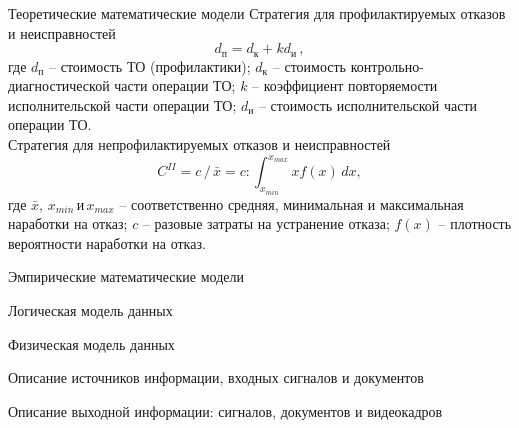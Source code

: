 \documentclass{beamer}
\begin{document}
\begin{frame}
	{Теоретические математические модели}
    Стратегия для профилактируемых отказов и неисправностей
    \begin{equation*}
        d_{\text{п}} = d_{\text{к}} + k d_{\text{и}}\,,
    \end{equation*}
    {\footnotesize
        где $d_{\text{п}}$ -- стоимость ТО (профилактики); $d_{\text{к}}$ --
        стоимость контрольно-диагностической части операции ТО; $k$ --
        коэффициент повторяемости исполнительской части операции ТО;
        $d_{\text{и}}$ -- стоимость исполнительской части операции ТО.
    }
    \\[\baselineskip]
    Стратегия для непрофилактируемых отказов и неисправностей
    \begin{equation*}
        C^{II} =
        c\,/\,\bar{x} =
        c : \int_{x_{min}}^{x_{max}} x f(x)\,dx,
    \end{equation*}
    {\footnotesize
        где $\bar{x},\,x_{min} \,\text{и} \,x_{max}$ -- соответственно средняя,
        минимальная и максимальная наработки на отказ; $c$ -- разовые затраты на
        устранение отказа; $f(x)$ -- плотность вероятности наработки на отказ.
    }
\end{frame}

\begin{frame}
	{Эмпирические математические модели}
\end{frame}

\begin{frame}
	{Логическая модель данных}
\end{frame}

\begin{frame}
	{Физическая модель данных}
\end{frame}

\begin{frame}
	{Описание источников информации, входных сигналов и документов}
\end{frame}

\begin{frame}
	{Описание выходной информации: сигналов, документов и видеокадров}
\end{frame}
\end{document}
